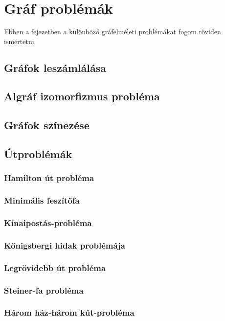 \chapter{Gráf problémák}\label{ch:ALAP}

\begin{osszefoglal}
	Ebben a fejezetben a különböző gráfelméleti problémákat fogom röviden ismertetni.
	
\end{osszefoglal}

\section{Gráfok leszámlálása}\label{sec:ALAP:adatelem}

\section{Algráf izomorfizmus probléma}\label{sec:ALAP:adatelem}


\section{Gráfok színezése}\label{sec:ALAP:adatelem}


\section{Útproblémák}\label{sec:ALAP:adatelem}

\subsection{Hamilton út probléma}

\subsection{Minimális feszítőfa}

\subsection{Kínaipostás-probléma}

\subsection{Königsbergi hidak problémája}

\subsection{Legrövidebb út probléma}

\subsection{Steiner-fa probléma}

\subsection{Három ház-három kút-probléma}

